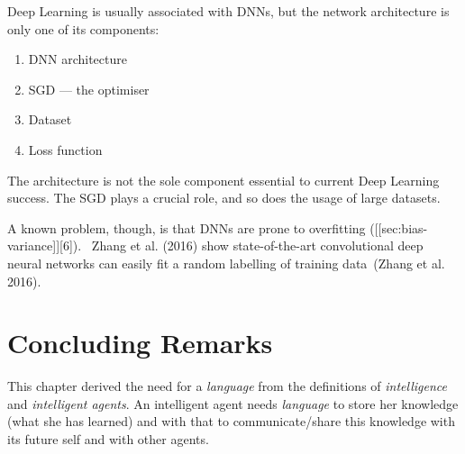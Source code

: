 \documentclass[
  letterpaper,
  12pt,
  british]{tufte-book}
\theoremstyle{plain}
\theoremstyle{definition}
\theoremstyle{plain}
\theoremstyle{remark}
\begin{document}
Deep Learning is usually associated with {DNNs}, but the network
architecture is only one of its components:

\begin{enumerate}
\def\labelenumi{\arabic{enumi}.}
\item
  DNN architecture
\item
  {SGD} --- the optimiser
\item
  Dataset
\item
  Loss function
\end{enumerate}

The architecture is not the sole component essential to current Deep
Learning success. The {SGD} plays a crucial role, and so does the usage
of large datasets.

A known problem, though, is that DNNs are prone to overfitting
({[}{[}sec:bias-variance{]}{]}{[}6{]}). ~Zhang et al.
(2016)
show state-of-the-art convolutional deep neural networks can easily fit
a random labelling of training data~(Zhang et al.
2016).

\hypertarget{concluding-remarks}{%
\section{Concluding Remarks}\label{concluding-remarks}}

This chapter derived the need for a \emph{language} from the definitions
of \emph{intelligence} and \emph{intelligent agents}. An intelligent
agent needs \emph{language} to store her knowledge (what she has
learned) and with that to communicate/share this knowledge with its
future self and with other agents.
\end{document}
